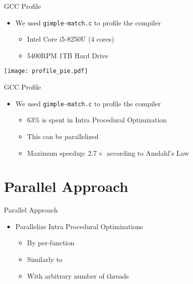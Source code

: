 \begin{frame}{GCC Profile}
    \begin{itemize}
        \item We used \texttt{gimple-match.c} to profile the compiler
            \begin{itemize}
                \item Intel Core i5-8250U (4 cores)
                \item 5400RPM 1TB Hard Drive
            \end{itemize}
    \end{itemize}

            \centering
            \texttt{[image: profile\_pie.pdf]}
\end{frame}

\begin{frame}{GCC Profile}
    \begin{itemize}
        \item We used \texttt{gimple-match.c} to profile the compiler
            \begin{itemize}
                \item 63\% is spent in Intra Procedural Optimization
                \item This can be parallelized
                \item Maximum speedup: $2.7\times$ according to Amdahl's Law
            \end{itemize}
    \end{itemize}

\end{frame}

\section{Parallel Approach}

\begin{frame}{Parallel Approach}
    \begin{itemize}
        \item Parallelize Intra Procedural Optimizations
            \begin{itemize}
                \item By per-function
                \item Similarly to \cite{wortman1992}
                \item With arbitrary number of threads
    \end{itemize}
\end{itemize}

\end{frame}

